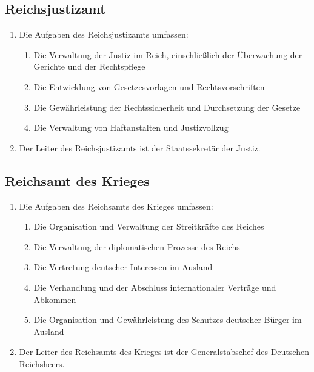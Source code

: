 \documentclass{article}
\begin{document}
\subsection{Reichsjustizamt}
\begin{enumerate}[(1)]
    \item Die Aufgaben des Reichsjustizamts umfassen:
    \begin{enumerate}[1.]
        \item Die Verwaltung der Justiz im Reich, einschließlich der Überwachung der Gerichte und der Rechtspflege
        \item Die Entwicklung von Gesetzesvorlagen und Rechtsvorschriften
        \item Die Gewährleistung der Rechtssicherheit und Durchsetzung der Gesetze
        \item Die Verwaltung von Haftanstalten und Justizvollzug
    \end{enumerate}
    \item Der Leiter des Reichsjustizamts ist der Staatssekretär der Justiz.
\end{enumerate}

\subsection{Reichsamt des Krieges}
\begin{enumerate}[(1)]
    \item Die Aufgaben des Reichsamts des Krieges umfassen:
    \begin{enumerate}[1.]
        \item Die Organisation und Verwaltung der Streitkräfte des Reiches
        \item Die Verwaltung der diplomatischen Prozesse des Reichs
        \item Die Vertretung deutscher Interessen im Ausland
        \item Die Verhandlung und der Abschluss internationaler Verträge und Abkommen
        \item Die Organisation und Gewährleistung des Schutzes deutscher Bürger im Ausland
    \end{enumerate}
    \item Der Leiter des Reichsamts des Krieges ist der Generalstabschef des Deutschen Reichsheers.
\end{enumerate}
\end{document}
